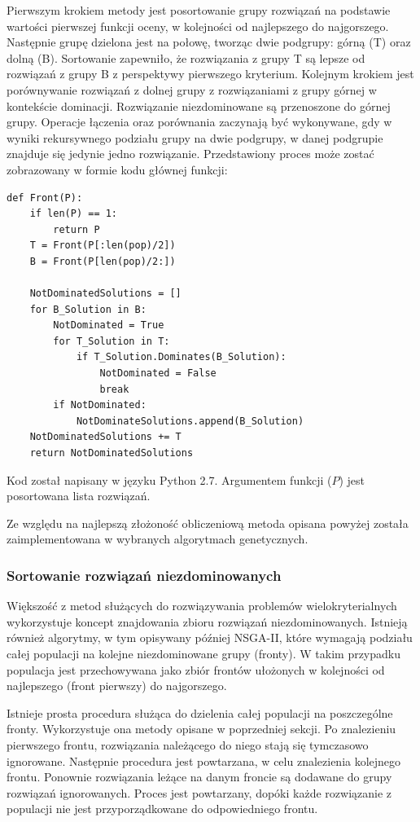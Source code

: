 \documentclass[twoside]{iisthesis}
\begin{document}
Pierwszym krokiem metody jest posortowanie grupy rozwiązań na podstawie wartości pierwszej funkcji oceny, w kolejności od najlepszego do najgorszego. Następnie grupę dzielona jest na połowę, tworząc dwie podgrupy: górną (T) oraz dolną (B). Sortowanie zapewniło, że rozwiązania z grupy T są lepsze od rozwiązań z grupy B z perspektywy pierwszego kryterium. Kolejnym krokiem jest porównywanie rozwiązań z dolnej grupy z rozwiązaniami z grupy górnej w kontekście dominacji. Rozwiązanie niezdominowane są przenoszone do górnej grupy. Operacje łączenia oraz porównania zaczynają być wykonywane, gdy w wyniki rekursywnego podziału grupy na dwie podgrupy, w danej podgrupie znajduje się jedynie jedno rozwiązanie. Przedstawiony proces może zostać zobrazowany w formie kodu głównej funkcji:
\begin{lstlisting}[label=some-code,caption=Znajdowanie rozwiązań niezdominowanych]
def Front(P):
	if len(P) == 1:
		return P
	T = Front(P[:len(pop)/2])
	B = Front(P[len(pop)/2:])
	
	NotDominatedSolutions = []
	for B_Solution in B:
		NotDominated = True
		for T_Solution in T:
			if T_Solution.Dominates(B_Solution):
				NotDominated = False
				break
		if NotDominated:
			NotDominateSolutions.append(B_Solution)
	NotDominatedSolutions += T
	return NotDominatedSolutions
\end{lstlisting}
Kod został napisany w języku Python 2.7. Argumentem funkcji ($P$) jest posortowana lista rozwiązań.

Ze względu na najlepszą złożoność obliczeniową metoda opisana powyżej została zaimplementowana w wybranych algorytmach genetycznych.

\subsubsection{Sortowanie rozwiązań niezdominowanych}
Większość z metod służących do rozwiązywania problemów wielokryterialnych wykorzystuje koncept znajdowania zbioru rozwiązań niezdominowanych. Istnieją również algorytmy, w tym opisywany później NSGA-II, które wymagają podziału całej populacji na kolejne niezdominowane grupy (fronty)\cite{book}. W takim przypadku populacja jest przechowywana jako zbiór frontów ułożonych w kolejności od najlepszego (front pierwszy) do najgorszego.

Istnieje prosta procedura służąca do dzielenia całej populacji na poszczególne fronty\cite{nsga}. Wykorzystuje ona metody opisane w poprzedniej sekcji. Po znalezieniu pierwszego frontu, rozwiązania należącego do niego stają się tymczasowo ignorowane. Następnie procedura jest powtarzana, w celu znalezienia kolejnego frontu. Ponownie rozwiązania leżące na danym froncie są dodawane do grupy rozwiązań ignorowanych. Proces jest powtarzany, dopóki każde rozwiązanie z populacji nie jest przyporządkowane do odpowiedniego frontu.
\end{document}
